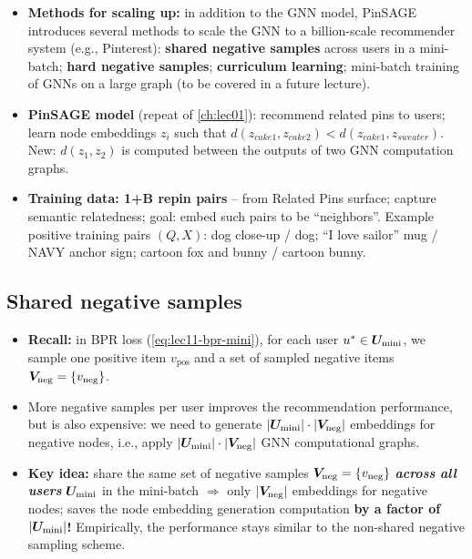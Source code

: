 \begin{itemize}
  \item \textbf{Methods for scaling up:} in addition to the GNN model, PinSAGE
    introduces several methods to scale the GNN to a billion-scale recommender
    system (e.g., Pinterest): \textbf{shared negative samples} across users in a
    mini-batch; \textbf{hard negative samples}; \textbf{curriculum learning};
    mini-batch training of GNNs on a large graph (to be covered in a future
    lecture).
  \item \textbf{PinSAGE model} (repeat of \cref{ch:lec01}): recommend related
    pins to users; learn node
    embeddings $z_i$ such that $d(z_{cake1},z_{cake2})<d(z_{cake1},z_{sweater})$.
    New: $d(z_1,z_2)$ is computed between the outputs of two GNN computation
    graphs.
  \item \textbf{Training data: 1+B repin pairs} -- from Related Pins surface;
    capture semantic relatedness; goal: embed such pairs to be ``neighbors''.
    Example positive training pairs $(Q,X)$: dog close-up / dog; ``I love
    sailor'' mug / NAVY anchor sign; cartoon fox and bunny / cartoon bunny.
\end{itemize}

\subsection{Shared negative samples}\label{sec:lec11-shared}

\begin{itemize}
  \item \textbf{Recall:} in BPR loss (\cref{eq:lec11-bpr-mini}), for each user
    $u^*\in\bm{U}_{\mathrm{mini}}$, we sample one positive item $v_{\mathrm{pos}}$ and a set of
    sampled negative items $\bm{V}_{\mathrm{neg}}=\{v_{\mathrm{neg}}\}$.
  \item More negative samples per user improves the recommendation performance,
    but is also expensive: we need to generate $|\bm{U}_{\mathrm{mini}}|\cdot|\bm{V}_{\mathrm{neg}}|$
    embeddings for negative nodes, i.e., apply $|\bm{U}_{\mathrm{mini}}|\cdot|\bm{V}_{\mathrm{neg}}|$ GNN
    computational graphs.
  \item \textbf{Key idea:} share the same set of negative samples
    $\bm{V}_{\mathrm{neg}}=\{v_{\mathrm{neg}}\}$ \textbf{\emph{across all users}} $\bm{U}_{\mathrm{mini}}$ in
    the mini-batch $\Rightarrow$ only $|\bm{V}_{\mathrm{neg}}|$ embeddings for negative nodes;
    saves the node embedding generation computation \textbf{by a factor of
    $|\bm{U}_{\mathrm{mini}}|$!} Empirically, the performance stays similar to the non-shared
    negative sampling scheme.
\end{itemize}

